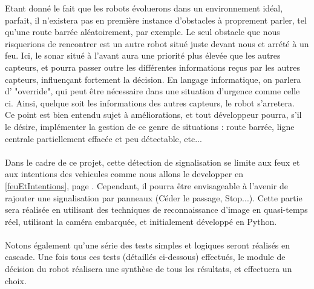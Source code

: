 		Etant donné le fait que les robots évoluerons dans un environnement idéal, parfait, il n'existera pas en première instance d'obstacles à proprement parler, tel qu'une route barrée aléatoirement, par exemple. Le seul obstacle que nous risquerions de rencontrer est un autre robot situé juste devant nous et arrété à un feu. Ici, le sonar situé à l'avant aura une priorité plus élevée que les autres capteurs, et pourra passer outre les différentes informations reçus par les autres capteurs, influençant fortement la décision. En langage informatique, on parlera d' "override", qui peut être nécessaire dans une situation d'urgence comme celle ci. Ainsi, quelque soit les informations des autres capteurs, le robot s'arretera.
		\\
		Ce point est bien entendu sujet à améliorations, et tout développeur pourra, s'il le désire, implémenter la gestion de ce genre de situations : route barrée, ligne centrale partiellement effacée et peu détectable, etc...
		\\\\
		Dans le cadre de ce projet, cette détection de signalisation se limite aux feux et aux intentions des vehicules comme nous allons le developper en \ref{feuEtIntentions}, page \pageref{feuEtIntentions}. Cependant, il pourra être envisageable à l'avenir de rajouter une signalisation par panneaux (Céder le passage, Stop...).
		Cette partie sera réalisée en utilisant des techniques de reconnaissance d'image en quasi-temps réel, utilisant la caméra embarquée, et initialement développé en Python.
		\\\\
		Notons également qu'une série des tests simples et logiques seront réalisés en cascade. Une fois tous ces tests (détaillés ci-dessous) effectués, le module de décision du robot réalisera une synthèse de tous les résultats, et effectuera un choix.
